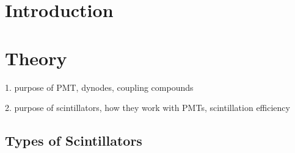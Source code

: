 \documentclass[12pt]{article}
\begin{document}
\begingroup
  \setlength{\parskip}{0pt} %
  \tableofcontents
\endgroup

\newpage

\begin{abstract}

{}



\end{abstract}

\section{Introduction}



\section{Theory}
\label{sec:theory}

1. purpose of PMT, dynodes, coupling compounds

2. purpose of scintillators, how they work with PMTs, scintillation efficiency

\subsection{Types of Scintillators}
\label{subsec:scint_types}
\end{document}
